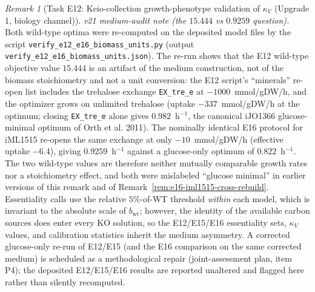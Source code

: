 \documentclass[11pt,a4paper]{article}
\theoremstyle{plain}
\theoremstyle{definition}
\theoremstyle{remark}
\newtheorem{remark}[theorem]{Remark}
\begin{document}
\begin{remark}[Task E12: Keio-collection growth-phenotype validation
of $\kappa_V$ (Upgrade 1, biology channel)]
\noindent\emph{v21 medium-audit note (the $15.444$ vs $0.9259$
question).} Both wild-type optima were re-computed on the deposited
model files by the script
\texttt{verify\_e12\_\allowbreak e16\_\allowbreak biomass\_\allowbreak units.py}
(output \texttt{verify\_e12\_\allowbreak e16\_\allowbreak biomass\_\allowbreak units.json}).
The re-run shows that the E12 wild-type objective value $15.444$ is
an artifact of the
medium construction, not of the biomass stoichiometry and not a unit
conversion: the E12 script's ``minerals'' re-open list includes the
trehalose exchange \texttt{EX\_tre\_e} at $-1000$~mmol/gDW/h, and
the optimizer grows on unlimited trehalose (uptake
$-337$~mmol/gDW/h at the optimum; closing \texttt{EX\_tre\_e}
alone gives $0.982$~h$^{-1}$, the canonical iJO1366 glucose-minimal
optimum of Orth et al. 2011). The nominally identical E16 protocol
for iML1515 re-opens the same exchange at only
$-10$~mmol/gDW/h (effective uptake $-6.4$), giving
$0.9259$~h$^{-1}$ against a glucose-only optimum of
$0.822$~h$^{-1}$. The two wild-type values are therefore neither
mutually comparable growth rates nor a stoichiometry effect, and both
were mislabeled ``glucose minimal'' in earlier versions of this
remark and of Remark~\ref{rem:e16-iml1515-cross-rebuild}.
Essentiality calls use the relative $5\%$-of-WT threshold
\emph{within} each model, which is invariant to the absolute scale
of $b_{\mathrm{wt}}$; however, the identity of the available carbon
sources does enter every KO solution, so the E12/E15/E16
essentiality sets, $\kappa_V$ values, and calibration statistics
inherit the medium asymmetry. A corrected glucose-only re-run of
E12/E15 (and the E16 comparison on the same corrected medium) is
scheduled as a methodological repair (joint-assessment plan, item
P4); the deposited E12/E15/E16 results are reported unaltered and
flagged here rather than silently recomputed.


\end{remark}
\end{document}
